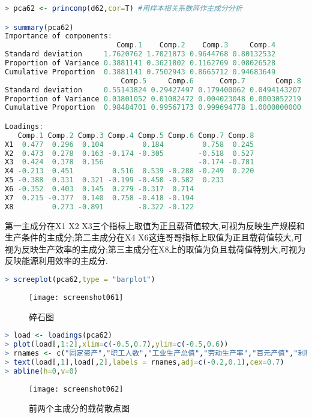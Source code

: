 \documentclass[11pt,a4paper,oneside]{book}
\begin{document}
\begin{lstlisting}[language=r]
> pca62 <- princomp(d62,cor=T) #用样本相关系数阵作主成分分析

> summary(pca62)
Importance of components:
                          Comp.1    Comp.2    Comp.3     Comp.4
Standard deviation     1.7620762 1.7021873 0.9644768 0.80132532
Proportion of Variance 0.3881141 0.3621802 0.1162769 0.08026528
Cumulative Proportion  0.3881141 0.7502943 0.8665712 0.94683649
                           Comp.5     Comp.6      Comp.7       Comp.8
Standard deviation     0.55143824 0.29427497 0.179400062 0.0494143207
Proportion of Variance 0.03801052 0.01082472 0.004023048 0.0003052219
Cumulative Proportion  0.98484701 0.99567173 0.999694778 1.0000000000

Loadings:
   Comp.1 Comp.2 Comp.3 Comp.4 Comp.5 Comp.6 Comp.7 Comp.8
X1  0.477  0.296  0.104         0.184         0.758  0.245
X2  0.473  0.278  0.163 -0.174 -0.305        -0.518  0.527
X3  0.424  0.378  0.156                      -0.174 -0.781
X4 -0.213  0.451         0.516  0.539 -0.288 -0.249  0.220
X5 -0.388  0.331  0.321 -0.199 -0.450 -0.582  0.233       
X6 -0.352  0.403  0.145  0.279 -0.317  0.714              
X7  0.215 -0.377  0.140  0.758 -0.418 -0.194              
X8         0.273 -0.891        -0.322 -0.122  
\end{lstlisting}
第一主成分在X1 X2 X3三个指标上取值为正且载荷值较大,可视为反映生产规模和生产条件的主成分;第二主成分在X4 X6这连哥哥指标上取值为正且载荷值较大,可视为反映生产效率的主成分;第三主成分在X8上的取值为负且载荷值特别大,可视为反映能源利用效率的主成分.

\begin{lstlisting}[language=r]
> screeplot(pca62,type = "barplot")
\end{lstlisting}
\begin{figure}[H]
	\centering
	\texttt{[image: screenshot061]}
	\caption{碎石图}
	\label{fig:screenshot061}
\end{figure}

\begin{lstlisting}[language=r]
> load <- loadings(pca62)
> plot(load[,1:2],xlim=c(-0.5,0.7),ylim=c(-0.5,0.6))
> rnames <- c("固定资产","职工人数","工业生产总值","劳动生产率","百元产值","利税率","燃料消费","能源利用")
> text(load[,1],load[,2],labels = rnames,adj=c(-0.2,0.1),cex=0.7)
> abline(h=0,v=0)
\end{lstlisting}
\begin{figure}[H]
	\centering
	\texttt{[image: screenshot062]}
	\caption{前两个主成分的载荷散点图}
	\label{fig:screenshot062}
\end{figure}
\end{document}
